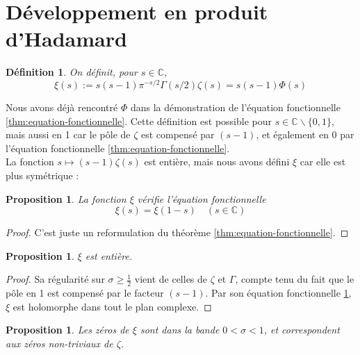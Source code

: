 \documentclass[french]{report}
\newtheorem{definition}[theorem]{Définition}
\newtheorem{proposition}[theorem]{Proposition}
\begin{document}
\section{Développement en produit d'Hadamard}

\begin{definition}
  On définit, pour $s\in\mathbb{C}$,
  \[
    \xi(s)
    := s(s-1)\pi^{-s/2}\Gamma(s/2)\zeta(s)
    = s(s-1)\Phi(s)
  \]
\end{definition}

Nous avons déjà rencontré $\Phi$ dans la démonstration de l'équation fonctionnelle \ref{thm:equation-fonctionnelle}. Cette définition est possible pour $s\in\mathbb{C}\backslash\{0,1\}$, mais aussi en 1 car le pôle de $\zeta$ est compensé par $(s-1)$, et également en 0 par l'équation fonctionnelle \ref{thm:equation-fonctionnelle}.
\\

La fonction $s\mapsto(s-1)\zeta(s)$ est entière, mais nous avons défini $\xi$ car elle est plus symétrique :

\begin{proposition}\label{prop:xi-equation-fonctionnelle}
  La fonction $\xi$ vérifie l'équation fonctionnelle
  \[ \xi(s) = \xi(1-s)\quad (s\in\mathbb{C}) \]
\end{proposition}

\begin{proof}
  C'est juste un reformulation du théorème \ref{thm:equation-fonctionnelle}.
\end{proof}

\begin{proposition}
  $\xi$ est entière.
\end{proposition}

\begin{proof}
  Sa régularité sur $\sigma\geq\frac{1}{2}$ vient de celles de $\zeta$ et $\Gamma$, compte tenu du fait que le pôle en 1 est compensé par le facteur $(s-1)$. Par son équation fonctionnelle \ref{prop:xi-equation-fonctionnelle}, $\xi$ est holomorphe dans tout le plan complexe.
\end{proof}

\begin{proposition}
  Les zéros de $\xi$ sont dans la bande $0<\sigma<1$, et correspondent aux zéros non-triviaux de $\zeta$.
\end{proposition}
\end{document}

